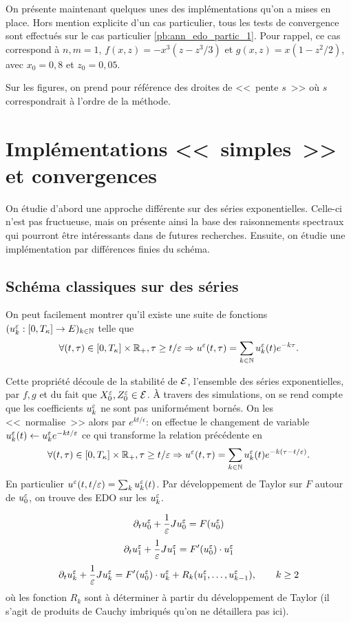 On présente maintenant quelques unes des implémentations qu'on a mises en place. 
Hors mention explicite d'un cas particulier, tous les tests de convergence sont effectués sur le cas particulier \eqref{pb:ann_edo_partic_1}. 
Pour rappel, ce cas correspond à $n,m = 1$, $f(x,z) = -x^3(z-z^3/3)$ et $g(x,z) = x(1-z^2/2)$, avec $x_0 = 0,8$ et $z_0 = 0,05$. 

Sur les figures, on prend pour référence des droites de <<~pente $s$~>> où $s$ correspondrait à l'ordre de la méthode. 


\section{Implémentations <<~simples~>> et convergences}

On étudie d'abord une approche différente sur des séries exponentielles. 
Celle-ci n'est pas fructueuse, mais on présente ainsi la base des raisonnements spectraux qui pourront être intéressants dans de futures recherches. 
Ensuite, on étudie une implémentation par différences finies du schéma. 

\subsection{Schéma classiques sur des séries} \label{subsec:series}

On peut facilement montrer qu'il existe une suite de fonctions $(u_k^{\varepsilon}:[0,T_{\kappa}]\rightarrow E)_{k\in\mathbb{N}}$ telle que 
$$ \forall (t,\tau)\in[0,T_{\kappa}]\times\mathbb{R}_+, \tau\geq t/\varepsilon \Rightarrow u^{\varepsilon}(t,\tau) = \sum_{k\in\mathbb{N}} u_k^{\varepsilon}(t)e^{-k\tau}. $$

Cette propriété découle de la stabilité de $\mathcal{E}$, l'ensemble des séries exponentielles, par $f,g$ et du fait que $X_0^{\varepsilon},Z_0^{\varepsilon} \in\mathcal{E}$. 
À travers des simulations, on se rend compte que les coefficients $u_k^{\varepsilon}$ ne sont pas uniformément bornés. 
On les <<~normalise~>> alors par $e^{kt/\epsilon}$: on effectue le changement de variable $u_k^{\varepsilon}(t) \leftarrow u_k^{\varepsilon} e^{-kt/\varepsilon}$ ce qui transforme la relation précédente en 
\begin{equation}
\forall (t,\tau)\in[0,T_{\kappa}]\times\mathbb{R}_+, \tau\geq t/\varepsilon \Rightarrow u^{\varepsilon}(t,\tau) = \sum_{k\in\mathbb{N}} u_k^{\varepsilon}(t)e^{-k(\tau-t/\varepsilon)}.
\end{equation}
En particulier $u^{\varepsilon}(t,t/\varepsilon) = \sum_k u_k^{\varepsilon}(t)$. Par développement de Taylor sur $F$ autour de $u_0^{\varepsilon}$, on trouve des EDO sur les $u_k^{\varepsilon}$. 

\begin{equation}
\partial_t u_0^{\varepsilon} + \frac{1}{\varepsilon} Ju_0^{\varepsilon} = F(u_0^{\varepsilon}) 
\end{equation}
\begin{equation}
\partial_t u_1^{\varepsilon} + \frac{1}{\varepsilon} Ju_1^{\varepsilon} = F'(u_0^{\varepsilon})\cdot u_1^{\varepsilon}
\end{equation}
\begin{equation}
\partial_t u_k^{\varepsilon} + \frac{1}{\varepsilon} Ju_k^{\varepsilon} = F'(u_0^{\varepsilon})\cdot u_k^{\varepsilon} + R_k(u_1^{\varepsilon},\ldots,u_{k-1}^{\varepsilon}), \qquad k\geq 2
\end{equation}
où les fonction $R_k$ sont à déterminer à partir du développement de Taylor (il s'agit de produits de Cauchy imbriqués qu'on ne détaillera pas ici). 

